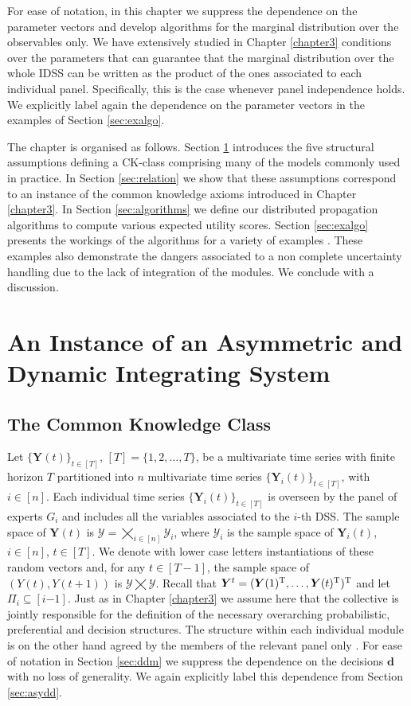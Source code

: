 For ease of notation, in this chapter we suppress the dependence on the parameter vectors and develop algorithms for the marginal distribution over the observables only. We have extensively studied in Chapter \ref{chapter3} conditions over the parameters that can guarantee that the marginal distribution over the whole IDSS can be written as the product of the ones associated to each individual panel. Specifically, this is the case whenever panel independence holds. We explicitly label again the dependence on the parameter vectors in the examples of Section \ref{sec:exalgo}.

The chapter is organised as follows. Section \ref{sec:asyclass} introduces the five structural assumptions defining a CK-class comprising many of the models commonly used in practice. In Section \ref{sec:relation} we show that these assumptions correspond to an instance of the common knowledge axioms introduced in Chapter \ref{chapter3}. In Section \ref{sec:algorithms} we define our distributed propagation algorithms to compute various expected utility scores. Section \ref{sec:exalgo} presents the workings of the algorithms for a variety of examples \citep[that can also be found in][]{Leonelli2013,Leonelli2013a,Leonelli2015,Smith2015}. These examples also demonstrate the dangers associated to a non complete uncertainty handling due to the lack of integration of the modules. We conclude with a discussion.

\section{An Instance of an Asymmetric and Dynamic Integrating System}
\label{sec:asyclass}
\subsection{The Common Knowledge Class}
Let $\{\bm{Y}(t)\}_{t\in [T]}$, $[T]=\{1,2,\dots,T\}$, be a multivariate time series with finite horizon $T $ partitioned into $n$ multivariate time series $\{\bm{Y}_i(t)\}_{t\in [T]}$, with $i\in[n]$.  Each individual time series $\{\bm{Y}_i(t)\}_{t\in [T]}$ is overseen by the panel of experts $G_i$ and includes all the variables associated to the $i$-th DSS. The sample space of $\bm{Y}(t)$ is $\bm{\mathcal{Y}}=\bigtimes_{i\in[n]}\bm{\mathcal{Y}}_i$, where $\bm{\mathcal{Y}}_i$ is the sample space of $\bm{Y}_i(t)$, $i\in[n]$, $t\in[T]$. We denote with lower case letters instantiations of these random vectors and, for any $t\in[T-1]$, the sample space of $(Y(t), Y(t+1))$ is $\bm{\mathcal{Y}}\bigtimes\bm{\mathcal{Y}}$. Recall that $\bm{Y}^t=(\bm{Y}(1)^{\textnormal{T}},\dots,\bm{Y}(t)^{\textnormal{T}})^{\textnormal{T}}$ and let $\Pi_i\subseteq[i{-1}]$. Just as in Chapter \ref{chapter3} we  assume here that the collective is jointly responsible for the definition of the necessary overarching probabilistic, preferential and decision structures. The structure within each individual module is on the other hand agreed  by the members of the relevant panel only \citep[as often in practice, see e.g.][]{von1986}. For ease of notation in Section \ref{sec:ddm} we suppress the dependence on the decisions $\bm{d}$ with no loss of generality. We again explicitly label this dependence from Section \ref{sec:asydd}.
  
